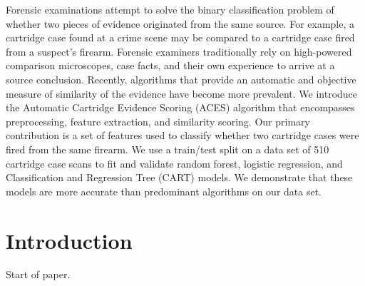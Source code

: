 \documentclass[11pt,]{isuthesis}
\begin{document}
Forensic examinations attempt to solve the binary classification problem of whether two pieces of evidence originated from the same source.
For example, a cartridge case found at a crime scene may be compared to a cartridge case fired from a suspect's firearm.
Forensic examiners traditionally rely on high-powered comparison microscopes, case facts, and their own experience to arrive at a source conclusion.
Recently, algorithms that provide an automatic and objective measure of similarity of the evidence have become more prevalent.
We introduce the Automatic Cartridge Evidence Scoring (ACES) algorithm that encompasses preprocessing, feature extraction, and similarity scoring.
Our primary contribution is a set of features used to classify whether two cartridge cases were fired from the same firearm.
We use a train/test split on a data set of 510 cartridge case scans to fit and validate random forest, logistic regression, and Classification and Regression Tree (CART) models.
We demonstrate that these models are more accurate than predominant algorithms on our data set.

\hypertarget{introduction-1}{%
\section{Introduction}\label{introduction-1}}

Start of paper.

\renewcommand\bibname{\centerline{REFERENCES}}
\unappendixtitle
\newpage
{}
{}

\end{document}
